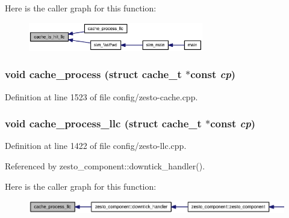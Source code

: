 Here is the caller graph for this function:\nopagebreak
\begin{figure}[H]
\begin{center}
\leavevmode
\includegraphics[width=216pt]{config_2zesto-cache_8h_4c8a74cb2e996679500e5a9adb9efb5c_icgraph}
\end{center}
\end{figure}
\subsubsection[{cache\_\-process}]{\setlength{\rightskip}{0pt plus 5cm}void cache\_\-process (struct {\bf cache\_\-t} $\ast$const  {\em cp})}\label{config_2zesto-cache_8h_93ce14ef87e7565964216ea27d912147}




Definition at line 1523 of file config/zesto-cache.cpp.
\subsubsection[{cache\_\-process\_\-llc}]{\setlength{\rightskip}{0pt plus 5cm}void cache\_\-process\_\-llc (struct {\bf cache\_\-t} $\ast$const  {\em cp})}\label{config_2zesto-cache_8h_7b2967a29a17913e313fceec0d9dbd4c}




Definition at line 1422 of file config/zesto-llc.cpp.

Referenced by zesto\_\-component::downtick\_\-handler().

Here is the caller graph for this function:\nopagebreak
\begin{figure}[H]
\begin{center}
\leavevmode
\includegraphics[width=320pt]{config_2zesto-cache_8h_7b2967a29a17913e313fceec0d9dbd4c_icgraph}
\end{center}
\end{figure}
